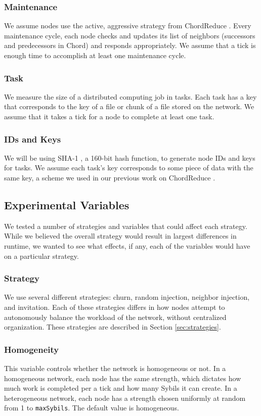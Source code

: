 \documentclass[10pt,conference]{IEEEtran}
\begin{document}
\subsubsection*{Maintenance} We assume nodes use the active, aggressive strategy from ChordReduce \cite{chordreduce}.
Every maintenance cycle, each node checks and updates its list of neighbors (successors and predecessors in Chord) and responds appropriately. 
We assume that a tick is enough time to accomplish at least one maintenance cycle.
\subsubsection*{Task} We measure the size of a distributed computing job in tasks.
Each task has a key that corresponds to the key of a file or chunk of a file stored on the network.
We assume that it takes a tick for a node to complete at least one task.
\subsubsection*{IDs and Keys} We will be using SHA-1 \cite{sha1}, a 160-bit hash function, to generate node IDs and keys for tasks.  
We assume each task's key corresponds to some piece of data with the same key, a scheme we used in  our previous work on ChordReduce \cite{chordreduce}.
	
\subsection{Experimental Variables}
We tested a number of strategies and variables that could affect each strategy.
While we believed the overall strategy would result in largest differences in runtime, we wanted to see what effects, if any, each of the variables would have on a particular strategy.

\subsubsection*{Strategy} We use several different strategies: churn, random injection, neighbor injection, and invitation.
Each of these strategies differs in how nodes attempt to autonomously balance the workload of the network, without centralized organization.
These strategies are described in Section \ref{sec:strategies}.
\subsubsection*{Homogeneity}  This variable controls whether the network is homogeneous or not.
In a homogeneous network, each node has the same strength, which dictates how much work is completed per a tick and how many Sybils it can create.
In a heterogeneous network, each node has a strength chosen uniformly at random from 1 to \texttt{maxSybils}.
The default value is homogeneous.
\end{document}
